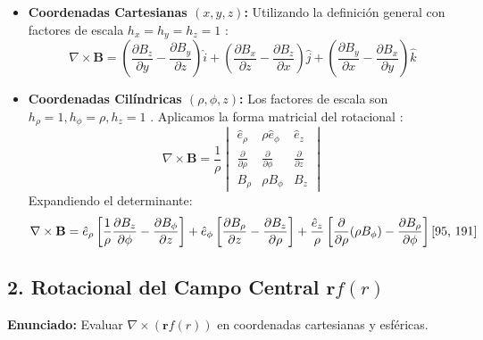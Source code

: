 \documentclass[a4paper]{article}
\begin{document}
\begin{itemize}
    \item \textbf{Coordenadas Cartesianas $(x, y, z)$:}
    Utilizando la definición general con factores de escala $h_x = h_y = h_z = 1$ \cite{90, 95}:
    \begin{equation}
        \nabla \times \mathbf{B} = \left( \frac{\partial B_z}{\partial y} - \frac{\partial B_y}{\partial z} \right) \hat{i} + \left( \frac{\partial B_x}{\partial z} - \frac{\partial B_z}{\partial x} \right) \hat{j} + \left( \frac{\partial B_y}{\partial x} - \frac{\partial B_x}{\partial y} \right) \hat{k}
    \end{equation}

    \item \textbf{Coordenadas Cilíndricas $(\rho, \phi, z)$:}
    Los factores de escala son $h_\rho = 1, h_\phi = \rho, h_z = 1$ \cite{73}. Aplicamos la forma matricial del rotacional \cite{95}:
    \begin{equation}
        \nabla \times \mathbf{B} = \frac{1}{\rho} 
        \begin{vmatrix} 
            \hat{e}_\rho & \rho \hat{e}_\phi & \hat{e}_z \\ 
            \frac{\partial}{\partial \rho} & \frac{\partial}{\partial \phi} & \frac{\partial}{\partial z} \\ 
            B_\rho & \rho B_\phi & B_z 
        \end{vmatrix}
    \end{equation}
    Expandiendo el determinante:
    \begin{equation}
        \nabla \times \mathbf{B} = \hat{e}_\rho \left[ \frac{1}{\rho} \frac{\partial B_z}{\partial \phi} - \frac{\partial B_\phi}{\partial z} \right] + \hat{e}_\phi \left[ \frac{\partial B_\rho}{\partial z} - \frac{\partial B_z}{\partial \rho} \right] + \frac{\hat{e}_z}{\rho} \left[ \frac{\partial}{\partial \rho}(\rho B_\phi) - \frac{\partial B_\rho}{\partial \phi} \right] \text{\cite{95, 191}}
    \end{equation}
\end{itemize}

\subsection*{2. Rotacional del Campo Central $\mathbf{r}f(r)$}
\textbf{Enunciado:} Evaluar $\nabla \times (\mathbf{r} f(r))$ en coordenadas cartesianas y esféricas.
\end{document}

